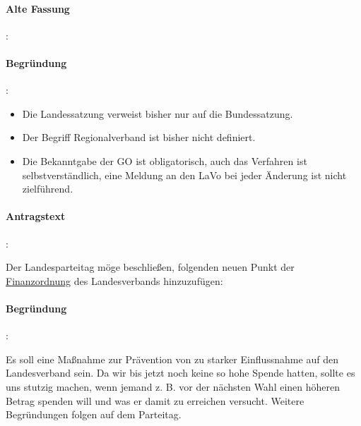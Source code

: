 \paragraph{Alte Fassung}:


\paragraph{Begründung}:

\begin{itemize}
\item Die Landessatzung verweist bisher nur auf die Bundessatzung.
\item Der Begriff Regionalverband ist bisher nicht definiert.
\item Die Bekanntgabe der GO ist obligatorisch, auch das Verfahren ist selbstverständlich, eine Meldung an den LaVo bei jeder Änderung ist nicht zielführend.
\end{itemize}



\paragraph{Antragstext}:

Der Landesparteitag möge beschließen, folgenden neuen Punkt der \href{http://wiki.piratenpartei.de/LSA:Satzung#Abschnitt_B:_Finanzordnung}{Finanzordnung} des Landesverbands hinzuzufügen:


\paragraph{Begründung}:

Es soll eine Maßnahme zur Prävention von zu starker Einflussnahme auf den Landesverband sein. Da wir bis jetzt noch keine so hohe Spende hatten, sollte es uns stutzig machen, wenn jemand z. B. vor der nächsten Wahl einen höheren Betrag spenden will und was er damit zu erreichen versucht. Weitere Begründungen folgen auf dem Parteitag.

